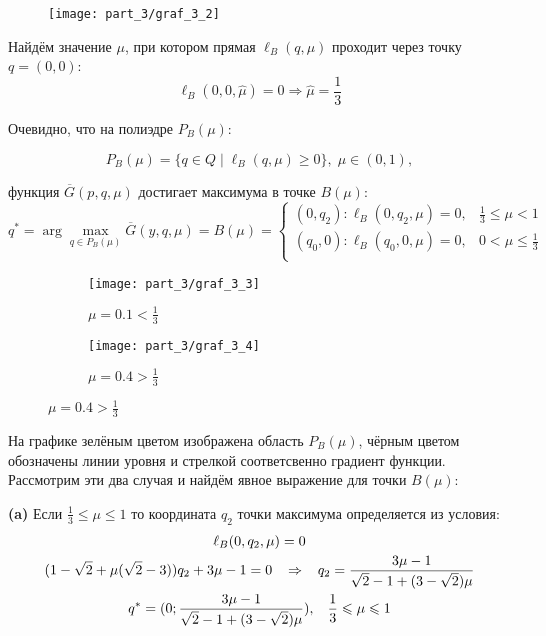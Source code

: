 \begin{figure}[H]
	\centering
  	\texttt{[image: part\_3/graf\_3\_2]}
  	\caption{}
  	\label{fig:l_B_limits}
\end{figure}
Найдём значение $\mu$, при котором прямая $\ell_B(q, \mu)$ проходит через точку
$q=(0,0)$:
$$
	\ell_B(0,0,\hat \mu) = 0
	\Rightarrow \hat \mu = \frac{1}{3}
$$	
	
Очевидно, что на полиэдре $P_B(\mu):$
		
$$
	P_B(\mu)=\{q \in Q \; | 
	\;  \ell_B(q, \mu) \geqslant 0 \}, \; \mu \in (0,1),
$$
	
функция $\overline{G}(p,q,\mu)$ достигает максимума в точке $B(\mu):$
$$
	q^* = \arg \max \limits_{q\in P_B(\mu)} \overline G(y,q,\mu) = B(\mu)=
	\begin{cases}
		(0, q_2) : \ell_B(0,q_2,\mu)=0, & \frac{1}{3} \leqslant \mu < 1 \\
		(q_0, 0) : \ell_B(q_0,0,\mu)=0, & 0 < \mu \leqslant \frac{1}{3} \\
	\end{cases}	
$$

\begin{figure}[H]
   	\centering
	\begin{subfigure}[b]{0.4 \textwidth}
        \centering
        \texttt{[image: part\_3/graf\_3\_3]}
        \caption{$\mu=0.1 < \frac{1}{3}$}
         \label{fig:y equals x}
     \end{subfigure}
     \hspace{10mm}
     \begin{subfigure}[b]{0.4 \textwidth}
       	\centering
       	\texttt{[image: part\_3/graf\_3\_4]}
       	\caption{$\mu=0.4 > \frac{1}{3}$}
       	\label{fig:three sin x}
     \end{subfigure}
\end{figure}	

На графике зелёным цветом изображена область $P_B(\mu)$, чёрным цветом
обозначены линии уровня и стрелкой соответсвенно градиент функции.
Рассмотрим эти два случая и найдём явное выражение для точки $B(\mu)$:
	
\textbf{(a)}
Если $\frac{1}{3} \leqslant \mu \leqslant 1$ то координата $q_2$ 
точки максимума определяется из условия: 	
\begin{gather*}
	\ell_B(0,q_2,\mu)=0
	\\
	(1-\sqrt{2}+\mu(\sqrt{2}-3))q_2+3\mu-1=0
	\hspace{3mm} \Rightarrow \hspace{3mm}
	q_2=\frac{3\mu-1}{\sqrt{2}-1+(3-\sqrt{2})\mu}	
	\\
	q^*=(0;\dfrac{3\mu-1}{\sqrt{2}-1+(3-\sqrt{2})\mu}), \hspace{3mm}
	\frac{1}{3} \leqslant \mu \leqslant 1
\end{gather*}

